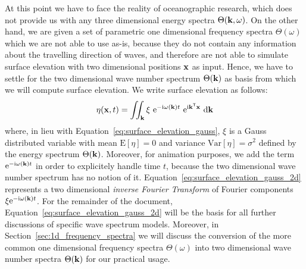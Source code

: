 At this point we have to face the reality of oceanographic research, which does 
not provide us with any three dimensional energy spectra 
$\Theta(\mathbf{k},\omega)$. On the other hand, we are given a set of 
parametric one dimensional frequency spectra $\Theta(\omega)$ which we are not 
able to use as-is, because they do not contain any information about the 
travelling direction of waves, and therefore are not able to simulate 
surface elevation with two dimensional positions $\mathbf{x}$ as input. Hence, we 
have to settle for the two dimensional wave number spectrum $\Theta(\mathbf{k})$ 
as basis from which we will compute surface elevation. We write surface 
elevation as follows:
\begin{equation}
\label{eq:surface_elevation_gauss_2d}
 \eta(\mathbf{x}, t) = \iint_{\mathbf{k}} 
\xi~\mathrm{e}^{-\mathrm{i}\omega(\mathbf{k}) t}
~\mathrm{e}^{\mathrm{i}\mathbf{k}^{\mathsf{T}}\mathbf{x}}~\mathrm{d}\mathbf{k}
\end{equation}
where, in lieu with Equation~\ref{eq:surface_elevation_gauss}, $\xi$ is 
a Gauss distributed variable with mean $\mathrm{E}[\eta] = 0$ and
variance $\mathrm{Var}[\eta] = \sigma^2$ defined by the energy spectrum
$\Theta(\mathbf{k})$. Moreover, for animation purposes, we add the term 
$\mathrm{e}^{-\mathrm{i}\omega(\mathbf{k}) t}$ in order to explicitely handle 
time $t$, because the two dimensional wave number spectrum has no notion of 
it. Equation~\ref{eq:surface_elevation_gauss_2d} represents a two dimensional 
\emph{inverse Fourier Transform} of Fourier components 
$\xi\mathrm{e}^{-\mathrm{i}\omega(\mathbf{k}) t}$. For the remainder of the 
document, Equation~\ref{eq:surface_elevation_gauss_2d} will be the basis for all 
further discussions of specific wave spectrum models. Moreover, in 
Section~\ref{sec:1d_frequency_spectra} we will discuss the conversion of the 
more common one dimensional frequency spectra $\Theta(\omega)$ into two 
dimensional wave number spectra $\Theta(\mathbf{k})$ for our practical usage.
%

